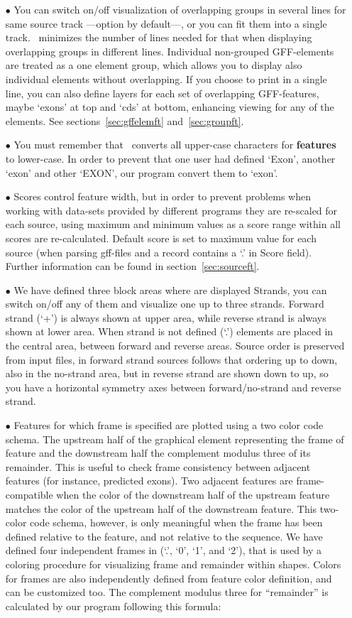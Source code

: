 \begin{itemize}
\item[$\bullet$] You can switch on/off visualization of overlapping groups in several lines for same source track ---option by default---, or you can fit them into a single track. \prog\ minimizes the number of lines needed for that when displaying overlapping groups in different lines. Individual non-grouped GFF-elements are treated as a one element group, which allows you to display also individual elements without overlapping. If you choose to print in a single line, you can also define layers for each set of overlapping GFF-features, maybe `exons' at top and `cds' at bottom, enhancing viewing for any of the elements. See sections~\ref{sec:gffelemft} and~\ref{sec:groupft}.
\item[$\bullet$] You must remember that \prog\ converts all upper-case characters for \textbf{features} to lower-case. In order to prevent that one user had defined `Exon', another `exon' and other `EXON', our program convert them to `exon'.
\item[$\bullet$] Scores control feature width, but in order to prevent problems when working with data-sets provided by different programs they are re-scaled for each source, using maximum and minimum values as a score range within all scores are re-calculated. Default score is set to maximum value for each source (when parsing gff-files and a record contains a `.' in Score field). Further information can be found in section~\ref{sec:sourceft}.
\item[$\bullet$] We have defined three block areas where are displayed Strands, you can switch on/off any of them and visualize one up to three strands. Forward strand (`+') is always shown at upper area, while reverse strand is always shown at lower area. When strand is not defined (`.') elements are placed in the central area, between forward and reverse areas. Source order is preserved from input files, in forward strand sources follows that ordering up to down, also in the no-strand area, but in reverse strand are shown down to up, so you have a horizontal symmetry axes between forward/no-strand and reverse strand.
\item[$\bullet$] Features for which frame is specified are plotted using a two color code schema. The upstream half of the graphical element representing the frame of feature and the downstream half the complement modulus three of its remainder. This is useful to check frame consistency between adjacent features (for instance, predicted exons). Two adjacent features are frame-compatible when the color of the downstream half of the upstream feature matches the color of the upstream half of the downstream feature. This two-color code schema, however, is only meaningful when the frame has been defined relative to the feature, and not relative to the sequence. We have defined four independent frames in \prog (`.', `0', `1', and `2'), that is used by a coloring procedure for visualizing frame and remainder within shapes. Colors for frames are also independently defined from feature color definition, and can be customized too. The complement modulus three for ``remainder'' is calculated by our program following this formula:\\[1ex]

\end{itemize}
